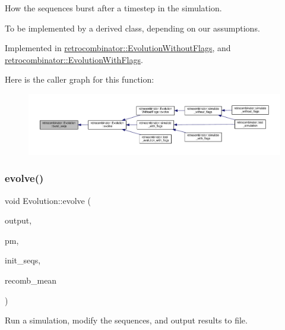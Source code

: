 How the sequences burst after a timestep in the simulation. 

To be implemented by a derived class, depending on our assumptions. 

Implemented in \hyperlink{classretrocombinator_1_1EvolutionWithoutFlags_aeba3cc75049e0590e5dcaab9558f8c56}{retrocombinator\+::\+Evolution\+Without\+Flags}, and \hyperlink{classretrocombinator_1_1EvolutionWithFlags_abad180fa8494b259e5167a13285347dd}{retrocombinator\+::\+Evolution\+With\+Flags}.

Here is the caller graph for this function\+:
\nopagebreak
\begin{figure}[H]
\begin{center}
\leavevmode
\includegraphics[width=350pt]{classretrocombinator_1_1Evolution_abab94a3f14460300a6a3b7a0286236a6_icgraph}
\end{center}
\end{figure}
\mbox{\label{classretrocombinator_1_1Evolution_a0b8a181242ea8ee3072258fa7ed416f4}} 
\subsubsection{\texorpdfstring{evolve()}{evolve()}}
{\footnotesize\ttfamily void Evolution\+::evolve (\begin{DoxyParamCaption}\item[{\hyperlink{classretrocombinator_1_1Output}{Output} \&}]{output,  }\item[{\hyperlink{classretrocombinator_1_1PointMutator}{Point\+Mutator} \&}]{pm,  }\item[{const std\+::vector$<$ std\+::string $>$ \&}]{init\+\_\+seqs,  }\item[{double}]{recomb\+\_\+mean }\end{DoxyParamCaption})\hspace{0.3cm}{\ttfamily [virtual]}}



Run a simulation, modify the sequences, and output results to file. 

